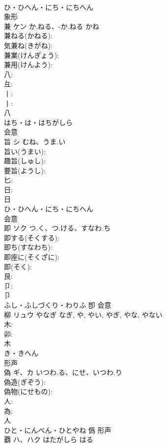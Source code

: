 \documentclass[8pt]{extreport}
\begin{document}
\begin{CJK}{UTF8}{min}
\\	ひ・ひへん・にち・にちへん	
\\	象形 
\\	兼	ケン	か.ねる、-か.ねる	かね	
\\	兼ねる(かねる): 
\\	気兼ね(きがね): 
\\	兼業(けんぎょう): 
\\	兼用(けんよう): 
\\	八: 
\\	彑: 
\\	丨: 
\\	丨: 
\\	八	
\\	はち・は・はちがしら	
\\	会意 
\\	旨	シ	むね、うま.い		
\\	旨い(うまい): 
\\	趣旨(しゅし): 
\\	要旨(ようし): 
\\	匕: 
\\	日: 
\\	日	
\\	ひ・ひへん・にち・にちへん	
\\	会意 
\\	即	ソク	つ.く、つ.ける、すなわ.ち		
\\	即する(そくする): 
\\	即ち(すなわち): 
\\	即座に(そくざに): 
\\	即(そく): 
\\	艮: 
\\	卩: 
\\	卩	
\\	ふし・ふしづくり・わりふ	卽	会意 
\\	柳	リュウ	やなぎ	なぎ, や, やい, やぎ, やな, やない	
\\	木: 
\\	卯: 
\\	木	
\\	き・きへん	
\\	形声 
\\	偽	ギ、カ	いつわ.る、にせ、いつわ.り		
\\	偽造(ぎぞう): 
\\	偽物(にせもの): 
\\	人: 
\\	為: 
\\	人	
\\	ひと・にんべん・ひとやね	僞	形声 
\\	覇	ハ、ハク	はたがしら	はる	

\end{CJK}
\end{document}
